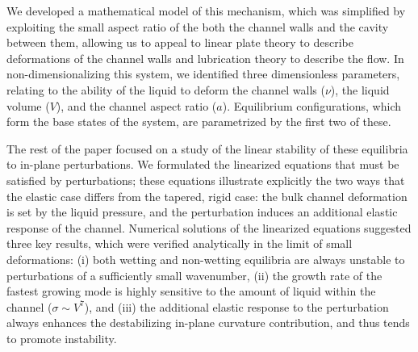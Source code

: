 \documentclass{jfm}
\begin{document}
We developed a mathematical model of this mechanism, which was simplified by exploiting the small aspect ratio of the both the channel walls and the cavity between them, allowing us to appeal to linear plate theory to describe deformations of the channel walls and lubrication theory to describe the flow. In non-dimensionalizing this system, we identified three dimensionless parameters, relating to the ability of the liquid to deform the channel walls ($\nu$), the liquid volume ($V$), and the channel aspect ratio ($a$). Equilibrium configurations, which form the base states of the system, are parametrized by the first two of these. 

The rest of the paper focused on a study of the linear stability of these equilibria to in-plane perturbations. We formulated the linearized equations that must be satisfied by perturbations; these equations illustrate explicitly the two ways that the elastic case differs from the tapered, rigid case: the bulk channel deformation is set by the liquid pressure, and the perturbation induces an additional elastic response of the channel. Numerical solutions of the linearized equations suggested three key results, which were verified analytically in the limit of small deformations: (i) both wetting and non-wetting equilibria are always unstable to perturbations of a sufficiently small wavenumber, (ii) the growth rate of the fastest growing mode is highly sensitive to the amount of liquid within the channel ($\sigma \sim V^7$), and (iii) the additional elastic response to the perturbation always enhances the destabilizing in-plane curvature contribution, and thus tends to promote instability.

\end{document}
